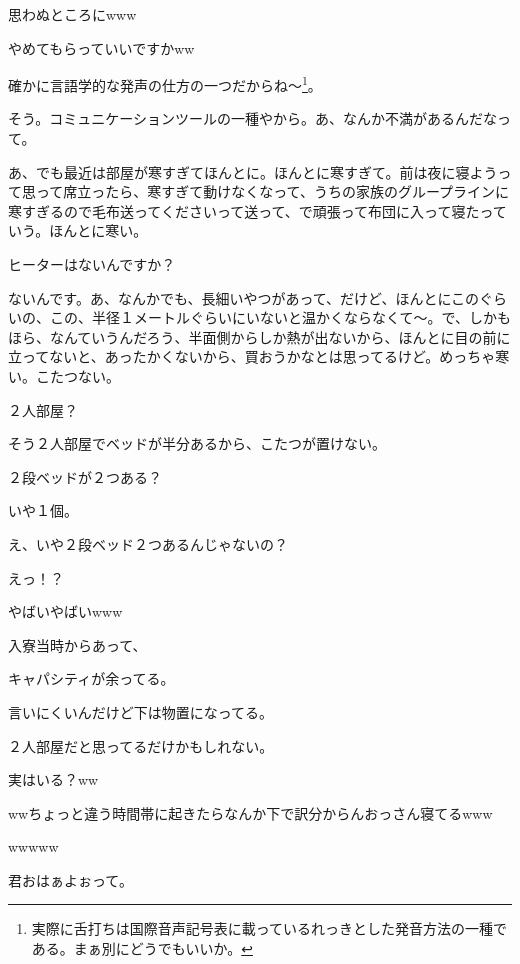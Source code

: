 \begin{multicols}{2}
  
思わぬところにwww

  
やめてもらっていいですかww

  
確かに言語学的な発声の仕方の一つだからね～\footnote{実際に舌打ちは国際音声記号表に載っているれっきとした発音方法の一種である。まぁ別にどうでもいいか。}。

  
そう。コミュニケーションツールの一種やから。あ、なんか不満があるんだなって。

  
あ、でも最近は部屋が寒すぎてほんとに。ほんとに寒すぎて。前は夜に寝ようって思って席立ったら、寒すぎて動けなくなって、うちの家族のグループラインに寒すぎるので毛布送ってくださいって送って、で頑張って布団に入って寝たっていう。ほんとに寒い。

  
ヒーターはないんですか？

  
ないんです。あ、なんかでも、長細いやつがあって、だけど、ほんとにこのぐらいの、この、半径１メートルぐらいにいないと温かくならなくて～。で、しかもほら、なんていうんだろう、半面側からしか熱が出ないから、ほんとに目の前に立ってないと、あったかくないから、買おうかなとは思ってるけど。めっちゃ寒い。こたつない。

  
２人部屋？

  
そう２人部屋でベッドが半分あるから、こたつが置けない。

  
２段ベッドが２つある？

  
いや１個。

  
え、いや２段ベッド２つあるんじゃないの？

  
えっ！？

  
やばいやばいwww

  
入寮当時からあって、

  
キャパシティが余ってる。

  
言いにくいんだけど下は物置になってる。

  
２人部屋だと思ってるだけかもしれない。

  
実はいる？ww

  
wwちょっと違う時間帯に起きたらなんか下で訳分からんおっさん寝てるwww

  
wwwww

  
 君おはぁよぉって。


\end{multicols}
